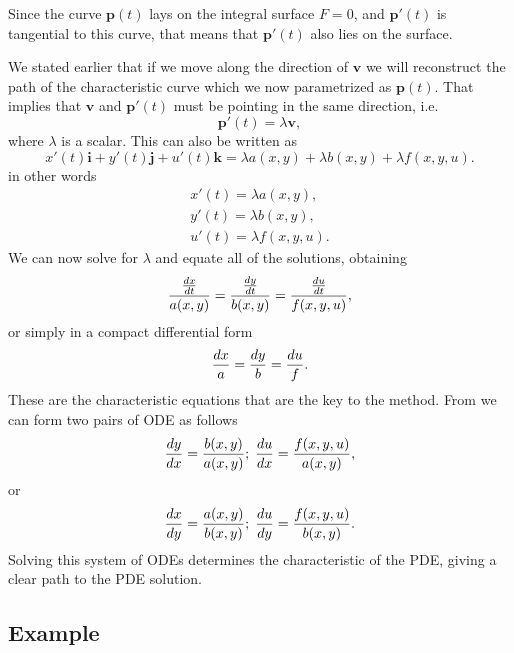 Since the curve $\mathbf{p}(t)$ lays on the integral surface $F = 0$, and
$\mathbf{p}'(t)$ is tangential to this curve, that means that $\mathbf{p}'(t)$
also lies on the surface.

We stated earlier that if we move along the direction of $\mathbf{v}$ we will
reconstruct the path of the characteristic curve which we now parametrized as
$\mathbf{p}(t)$. That implies that $\mathbf{v}$ and $\mathbf{p}'(t)$ must be
pointing in the same direction, i.e.
\begin{equation}
  \mathbf{p}'(t) = \lambda \mathbf{v},
\end{equation}
where $\lambda$ is a scalar. This can also be written as
\begin{equation}
  x'(t)\mathbf{i} + y'(t)\mathbf{j} + u'(t)\mathbf{k} =
  \lambda a(x,y) + \lambda b(x,y) + \lambda f(x,y,u).
\end{equation}
in other words
\begin{align}
  x'(t) = \lambda a(x,y),\\
  y'(t) = \lambda b(x,y), \\
  u'(t) = \lambda f(x,y,u).
\end{align}
We can now solve for $\lambda$ and equate all of the solutions, obtaining
\begin{equation}
  {{dx \over dt} \over a(x,y)} =
  {{dy \over dt} \over b(x,y)} =
  {{du \over dt} \over f(x,y,u)},
  \label{eq_char_eq}
\end{equation}
or simply in a compact differential form
\begin{equation}
  {dx \over a} = {dy \over b} = {du \over f}.
\end{equation}
These are the characteristic equations that are the key to the method. From
\eref[eq_char_eq] we can form two pairs of ODE as follows
\begin{equation}
  {dy \over dx} = {b(x,y) \over a(x,y)}; \;
  {du \over dx} = {f(x,y,u)\over a(x,y)},
\end{equation}
or
\begin{equation}
  {dx \over dy} = {a(x,y) \over b(x,y)}; \;
  {du \over dy} = {f(x,y,u)\over b(x,y)}.
\end{equation}
Solving this system of ODEs determines the characteristic of the PDE, giving
a clear path to the PDE solution.

\subsection{Example}

